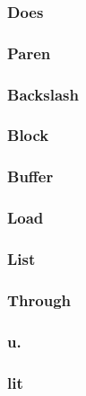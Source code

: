 \subsubsection{Does}

\subsubsection{Paren}
\subsubsection{Backslash}

\subsubsection{Block}
\subsubsection{Buffer}
\subsubsection{Load}
\subsubsection{List}
\subsubsection{Through}

\subsubsection{u.}
\subsubsection{lit}